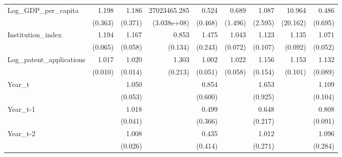 \begin{table}[htbp]
\begin{tabular}{l*{8}{D{.}{.}{-1}}}
Log\_GDP\_per\_capita&       1.198         &       1.186         &27023465.285         &       0.524         &       0.689         &       1.087         &      10.964         &       0.486         \\
            &     (0.363)         &     (0.371)         & (3.038e+08)         &     (0.468)         &     (1.496)         &     (2.595)         &    (20.162)         &     (0.695)         \\
Institution\_index&       1.194\sym{***}&       1.167\sym{***}&       0.853         &       1.475\sym{**} &       1.043         &       1.123         &       1.135         &       1.071         \\
            &     (0.065)         &     (0.058)         &     (0.134)         &     (0.243)         &     (0.072)         &     (0.107)         &     (0.092)         &     (0.052)         \\
Log\_patent\_applications&       1.017         &       1.020         &       1.303         &       1.002         &       1.022         &       1.156         &       1.153         &       1.132         \\
            &     (0.010)         &     (0.014)         &     (0.213)         &     (0.051)         &     (0.058)         &     (0.154)         &     (0.101)         &     (0.089)         \\
Year\_t      &                     &       1.050         &                     &       0.854         &                     &       1.653         &                     &       1.109         \\
            &                     &     (0.053)         &                     &     (0.600)         &                     &     (0.925)         &                     &     (0.104)         \\
Year\_t-1    &                     &       1.018         &                     &       0.499         &                     &       0.648         &                     &       0.808\sym{*}  \\
            &                     &     (0.041)         &                     &     (0.366)         &                     &     (0.217)         &                     &     (0.091)         \\
Year\_t-2    &                     &       1.008         &                     &       0.435         &                     &       1.012         &                     &       1.096         \\
            &                     &     (0.026)         &                     &     (0.414)         &                     &     (0.271)         &                     &     (0.284)         \\

\end{tabular}
\end{table}
